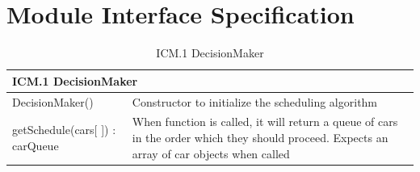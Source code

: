 \documentclass [10pt]{article}
\begin{document}




\section{Module Interface Specification}




\begin{longtable}{| p{ } | p{ } | }\caption{ICM.1 DecisionMaker} \\\hline  
 \multicolumn{2}{|l|}{\textbf {ICM.1 DecisionMaker}}\\ \hline
 
\cellcolor{tableCell}DecisionMaker()& \cellcolor{tableCell}Constructor to initialize the scheduling algorithm \\ \hline 

getSchedule(cars[ ]) : carQueue & When function is called, it will return a queue of cars in the order which they should proceed. Expects an array of car objects when called\\ \hline 



\end{longtable}
\end{document}
